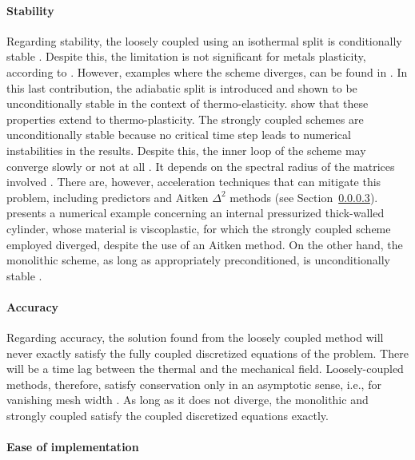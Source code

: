\paragraph{Stability}

Regarding stability, the loosely coupled using an isothermal split is conditionally stable \citep{armero_new_1992}.
Despite this, the limitation is not significant for metals plasticity, according to \cite{simo_associative_1992}.
However, examples where the scheme diverges, can be found in \cite{armero_new_1992}.
In this last contribution, the adiabatic split is introduced and shown to be unconditionally stable in the context of thermo-elasticity.
\cite{armero_priori_1993} show that these properties extend to thermo-plasticity.
The strongly coupled schemes are unconditionally stable because no critical time step leads to numerical instabilities in the results.
Despite this, the inner loop of the scheme may converge slowly or not at all \cite{matthies_strong_2003}.
It depends on the spectral radius of the matrices involved \citep{cervera_computational_1996}.
There are, however, acceleration techniques that can mitigate this problem, including predictors and Aitken \(\Delta^2\) methods (see Section~\ref{}).
\cite{danowski_computational_2014} presents a numerical example concerning an internal pressurized thick-walled cylinder, whose material is viscoplastic, for which the strongly coupled scheme employed diverged, despite the use of an Aitken method.
On the other hand, the monolithic scheme, as long as appropriately preconditioned, is unconditionally stable \citep{danowski_computational_2014}.

\paragraph{Accuracy}

Regarding accuracy, the solution found from the loosely coupled method will never exactly satisfy the fully coupled discretized equations of the problem.
There will be a time lag between the thermal and the mechanical field.
Loosely-coupled methods, therefore, satisfy conservation only in an asymptotic sense, i.e., for vanishing mesh width \citep{michler_efficient_2005}.
As long as it does not diverge, the monolithic and strongly coupled satisfy the coupled discretized equations exactly.

\paragraph{Ease of implementation}

